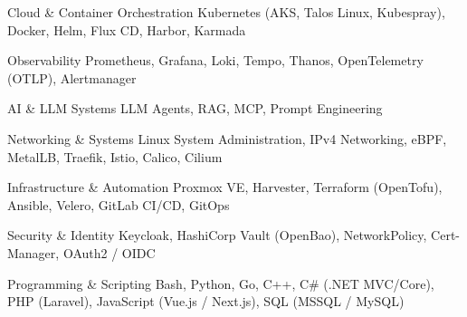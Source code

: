 
\begin{cvskills}

  \cvskill
    {Cloud \& Container Orchestration} %
    {Kubernetes (AKS, Talos Linux, Kubespray), Docker, Helm, Flux CD, Harbor, Karmada} %

  \cvskill
    {Observability} %
    {Prometheus, Grafana, Loki, Tempo, Thanos, OpenTelemetry (OTLP), Alertmanager} %

  \cvskill
    {AI \& LLM Systems} %
    {LLM Agents, RAG, MCP, Prompt Engineering} %

  \cvskill
    {Networking \& Systems} %
    {Linux System Administration, IPv4 Networking, eBPF, MetalLB, Traefik, Istio, Calico, Cilium} %

  \cvskill
    {Infrastructure \& Automation} %
    {Proxmox VE, Harvester, Terraform (OpenTofu), Ansible, Velero, GitLab CI/CD, GitOps} %

  \cvskill
    {Security \& Identity} %
    {Keycloak, HashiCorp Vault (OpenBao), NetworkPolicy, Cert-Manager, OAuth2 / OIDC} %

  \cvskill
    {Programming \& Scripting} %
    {Bash, Python, Go, C++, C\# (.NET MVC/Core), PHP (Laravel), JavaScript (Vue.js / Next.js), SQL (MSSQL / MySQL)} %

\end{cvskills}
